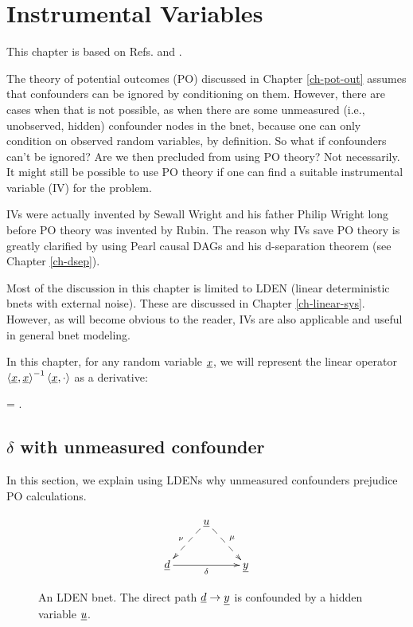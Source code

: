 \chapter{Instrumental Variables}
\label{ch-instrumental}


This chapter is based on
Refs.\cite{book-mixtape} and \cite{wiki-inst-vars}.

The theory of potential outcomes (PO)
discussed in Chapter \ref{ch-pot-out}
assumes that confounders can be ignored
by conditioning on them.
However, there are cases when
that is not possible, as when there are some
unmeasured (i.e., unobserved, hidden)
confounder nodes in the bnet,
because one can
only condition on observed random 
variables, by definition.
So what if confounders can't be ignored?
Are we then precluded from using PO theory?
Not necessarily.
It might still be possible to
use PO theory if one can find a suitable
instrumental variable (IV) for the problem.

IVs were actually invented 
by Sewall Wright and his father Philip
Wright long before
PO theory was invented  by Rubin.
The reason why IVs save PO theory
is greatly clarified by using
Pearl causal DAGs and his d-separation theorem 
(see Chapter \ref{ch-dsep}).

Most of the discussion in this chapter
is  limited to LDEN (linear deterministic
bnets with external noise). These
are discussed in Chapter \ref{ch-linear-sys}.
However, as will become
obvious to the reader, IVs are 
also applicable
and useful
in general bnet modeling.

In this
chapter, 
for any random
variable ${\underline{x}}$, we will represent 
the linear 
operator
$\left\langle{\underline{x}}, {\underline{x}}\right\rangle^{-1}\left\langle{\underline{x}}, \cdot\right\rangle
$ as a derivative:

\beq
{}=
\frac{\av{\rvx, \cdot}}
{\av{\rvx, \rvx}}
\;.
\eeq


\section{$\delta$ with unmeasured confounder}

In this section,
we explain using LDENs 
why
unmeasured confounders 
prejudice PO calculations.

\begin{figure}[h!]
$$
\xymatrix{
&\rvu\ar@{-->}[dl]_\nu\ar@{-->}[dr]^\mu
\\
\rvd\ar[rr]_\delta&&\rvy
}$$
\caption{An LDEN bnet. The direct path ${\underline{d}}\rightarrow{\underline{y}}$
is confounded by
a hidden variable ${\underline{u}}$.
} 
\label{fig-iv-G-start}
\end{figure}

